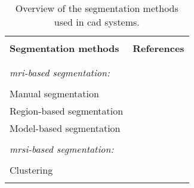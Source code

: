 \begin{table}
	\caption{Overview of the segmentation methods used in \ac{cad} systems.}
	\small
	\renewcommand{\arraystretch}{.8}
	\begin{tabular}{p{.65\linewidth} p{.25\linewidth}}
		\hline \\ [-1.5ex]
		\textbf{Segmentation methods} & \textbf{References} \\ \\ [-1.5ex]
		\hline \\ [-1.5ex]
		\textit{\ac{mri}-based segmentation:} & \\ \\ [-1.5ex]
		\quad Manual segmentation & \cite{Artan2009,Artan2010,Matulewicz2013,Niaf2011,Niaf2012,Ozer2009,Ozer2010,Puech2009,Vos2008,Vos2008a,Vos2010,Vos2012} \\
		\quad Region-based segmentation & \cite{Litjens2012,Litjens2014} \\
		\quad Model-based segmentation & \cite{Litjens2011,Viswanath2008a,Viswanath2009,Viswanath2011,Vos2012} \\ \\ [-1.5ex]
		\textit{\ac{mrsi}-based segmentation:} & \\ \\ [-1.5ex]
		\quad Clustering & \cite{Tiwari2009} \\ \\ [-1.5ex]
		\hline
	\end{tabular}
	\label{tab:seg}
\end{table}

